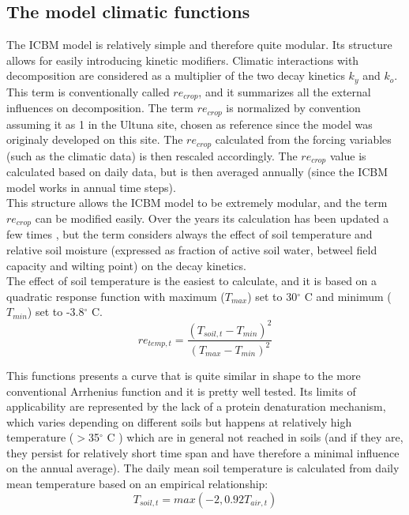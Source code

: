 \documentclass[review]{elsarticle}
\begin{document}
\subsection{The model climatic functions}
The ICBM model is relatively simple and therefore quite modular. Its structure allows for easily introducing kinetic modifiers.
Climatic interactions with decomposition are considered as a multiplier of the two decay kinetics $k_y$ and $k_o$. This term is conventionally called $re_{crop}$, and it summarizes all the external influences on decomposition. The term $re_{crop}$ is normalized by convention assuming it as 1 in the Ultuna site, chosen as reference since the model was originaly developed on this site. The $re_{crop}$ calculated from the forcing variables (such as the climatic data) is then rescaled accordingly. The $re_{crop}$ value is calculated based on daily data, but is then averaged annually (since the ICBM model works in annual time steps).\\
This structure allows the ICBM model to be extremely modular, and the term $re_{crop}$ can be modified easily. Over the years its calculation has been updated a few times \cite{Andren2004}, but the term considers always the effect of soil temperature and relative soil moisture (expressed as fraction of active soil water, betweel field capacity and wilting point) on the decay kinetics.\\
The effect of soil temperature is the easiest to calculate, and it is based on a quadratic response function \cite{Andren2004} with maximum ($T_{max}$) set to 30$^{\circ}$ C and minimum ($T_{min}$) set to -3.8$^{\circ}$ C. 
\begin{equation}
re_{temp, t}=\frac{(T_{soil, t}-T_{min})^2}{(T_{max}-T_{min})^2}
\label{equation:retemp}
\end{equation}

This functions presents a curve that is quite similar in shape to the more conventional Arrhenius function \cite{Lloyd1994} and it is pretty well tested. Its limits of applicability are represented by the lack of a protein denaturation mechanism, which varies depending on different soils but happens at relatively high temperature ($>$35$^{\circ}$ C \cite{Ratkowsky2005}) which are in general not reached in soils (and if they are, they persist for relatively short time span and have therefore a minimal influence on the annual average). The daily mean soil temperature is calculated from daily mean temperature based on an empirical relationship:
\begin{equation}
T_{soil, t}=max(-2, 0.92T_{air, t})
\label{equation:soiltemp}
\end{equation}\\
\end{document}
